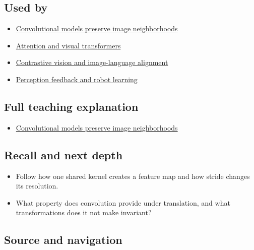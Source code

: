 \subsection{Used by}\label{used-by}

\begin{itemize}
\tightlist
\item
  \href{Continuous\%20Notes/University\%20-\%20Worlds,\%20Images\%20and\%20Inference\%20-\%20Graphics,\%20Vision\%20and\%20Photography\#Convolutional\%20models\%20preserve\%20image\%20neighborhoods}{Convolutional models preserve image neighborhoods}
\item
  \hyperref[appendix-a9d5dfdd164a]{Attention and visual transformers}
\item
  \hyperref[appendix-772f1fd96148]{Contrastive vision and image-language alignment}
\item
  \hyperref[appendix-b0c42da325f1]{Perception feedback and robot learning}
\end{itemize}

\subsection{Full teaching explanation}\label{full-teaching-explanation}

\begin{itemize}
\tightlist
\item
  \href{Continuous\%20Notes/University\%20-\%20Worlds,\%20Images\%20and\%20Inference\%20-\%20Graphics,\%20Vision\%20and\%20Photography\#Convolutional\%20models\%20preserve\%20image\%20neighborhoods}{Convolutional models preserve image neighborhoods}
\end{itemize}

\subsection{Recall and next depth}\label{recall-and-next-depth}

\begin{itemize}
\tightlist
\item
  Follow how one shared kernel creates a feature map and how stride changes its resolution.
\item
  What property does convolution provide under translation, and what transformations does it not make invariant?
\end{itemize}

\subsection{Source and navigation}\label{source-and-navigation}

